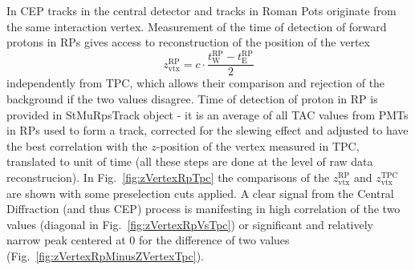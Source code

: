 In CEP tracks in the central detector and tracks in Roman Pots originate from the same interaction vertex. Measurement of the time of detection of forward protons in RPs gives access to reconstruction of the position of the vertex
\begin{equation}
z_{\text{vtx}}^{\text{RP}} = c\cdot\frac{t^{\text{RP}}_{\text{W}} - t^{\text{RP}}_{\text{E}}}{2}
\end{equation}
independently from TPC, which allows their comparison and rejection of the background if the two values disagree. Time of detection of proton in RP is provided in StMuRpsTrack object - it is an average of all TAC values from PMTs in RPs used to form a track, corrected for the slewing effect and adjusted to have the best correlation with the $z$-position of the vertex measured in TPC, translated to unit of time (all these steps are done at the level of raw data reconstrucion). In Fig.~\ref{fig:zVertexRpTpc} the comparisons of the $z_{\text{vtx}}^{\text{RP}}$ and $z_{\text{vtx}}^{\text{TPC}}$ are shown with some preselection cuts applied. A clear signal from the Central Diffraction (and thus CEP) process is manifesting in high correlation of the two values (diagonal in Fig.~\ref{fig:zVertexRpVsTpc}) or significant and relatively narrow peak centered at 0 for the difference of two values (Fig.~\ref{fig:zVertexRpMinusZVertexTpc}). %
